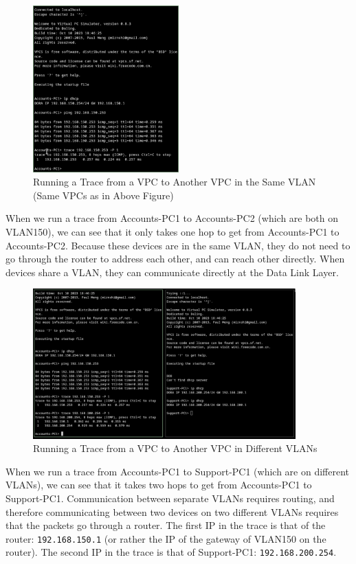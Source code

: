 \documentclass[a4paper]{article}
\begin{document}
\begin{figure}[H]
    \centering
    \includegraphics[width=0.5\textwidth]{./images/six.png}
    \caption{Running a Trace from a VPC to Another VPC in the Same VLAN (Same VPCs as in Above Figure)}
\end{figure}

When we run a trace from Accounts-PC1 to Accounts-PC2 (which are both on VLAN150), we can see that it only takes one hop to get from Accounts-PC1 to Accounts-PC2. 
Because these devices are in the same VLAN, they do not need to go through the router to address each other, and can reach other directly.
When devices share a VLAN, they can communicate directly at the Data Link Layer.

\begin{figure}[H]
    \centering
    \includegraphics[width=0.9\textwidth]{./images/seven.png}
    \caption{Running a Trace from a VPC to Another VPC in Different VLANs}
\end{figure}

When we run a trace from Accounts-PC1 to Support-PC1 (which are on different VLANs), we can see that it takes two hops to get from Accounts-PC1 to Support-PC1. 
Communication between separate VLANs requires routing, and therefore communicating between two devices on two different VLANs requires that the packets go through a
router. 
The first IP in the trace is that of the router: \verb|192.168.150.1| (or rather the IP of the gateway of VLAN150 on the router).
The second IP in the trace is that of Support-PC1: \verb|192.168.200.254|.
\end{document}
